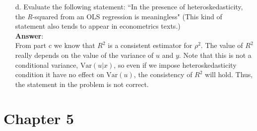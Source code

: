 \documentclass[10pt]{article}
\newcommand{\V}{\text{Var}}
\newcommand{\plim}{\text{plim}}
\begin{document}
\begin{enumerate}
\begin{align*}
\end{align*}
Now take $\plim$ of $R^2$, we have
\begin{align*}
    \plim(R^2)&=\plim\left(1-\frac{\sum_{i=1}^N\hat{u}_i^2}{\sum_{i=1}^N(y_i-\bar{y})^2}\right)& &\\
    &=\plim\left(1-\frac{\frac{1}{N}\sum_{i=1}^N\hat{u}_i^2}{\frac{1}{N}\sum_{i=1}^N(y_i-\bar{y})^2}\right)& &\\
    &=1-\frac{\plim(\frac{1}{N}\sum_{i=1}^N\hat{u}_i^2)}{\plim(\frac{1}{N}\sum_{i=1}^N(y_i-\bar{y})^2)}& \ \ \ &[\text{by Slutsky's theorem}]\\
    &=1-\sigma_u^2 / \sigma_y^2.
\end{align*}\qed
\item[d.] Evaluate the following statement: ``In the presence of heteroskedasticity, the \textit{R}-squared from an OLS regression is meaningless" (This kind of statement also tends to appear in econometrics texts.)
\\ \textbf{Answer}:\\
From part c we know that $R^2$ is a consistent estimator for $\rho^2.$ The value of $R^2$ really depends on the value of the variance of $u$ and $y$. Note that this is not a conditional variance, $\V(u|x)$, so even if we impose heteroskedasticity condition it have no effect on $\V(u)$, the consistency of $R^2$ will hold. Thus, the statement in the problem is not correct.
\end{enumerate}

\section*{Chapter 5}
\end{document}
